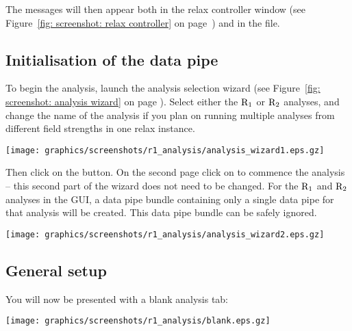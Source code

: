 
The messages will then appear both in the relax controller window (see Figure~\ref{fig: screenshot: relax controller} on page~\pageref{fig: screenshot: relax controller}) and in the  file.



\subsection{Initialisation of the data pipe}

To begin the analysis, launch the analysis selection wizard (see Figure~\ref{fig: screenshot: analysis wizard} on page \pageref{fig: screenshot: analysis wizard}).  Select either the $\mathrm{R}_1$ or $\mathrm{R}_2$ analyses, and change the name of the analysis if you plan on running multiple analyses from different field strengths in one relax instance.

\begin{minipage}[h]{\linewidth}
\centerline{\texttt{[image: graphics/screenshots/r1\_analysis/analysis\_wizard1.eps.gz]}}
\end{minipage}

Then click on the  button.  On the second page click on  to commence the analysis -- this second part of the wizard does not need to be changed.  For the $\mathrm{R}_1$ and $\mathrm{R}_2$ analyses in the GUI, a data pipe bundle containing only a single data pipe for that analysis will be created.  This data pipe bundle can be safely ignored.

\begin{minipage}[h]{\linewidth}
\centerline{\texttt{[image: graphics/screenshots/r1\_analysis/analysis\_wizard2.eps.gz]}}
\end{minipage}



\subsection{General setup}

You will now be presented with a blank analysis tab:

\begin{minipage}[h]{\linewidth}
\centerline{\texttt{[image: graphics/screenshots/r1\_analysis/blank.eps.gz]}}
\end{minipage}

